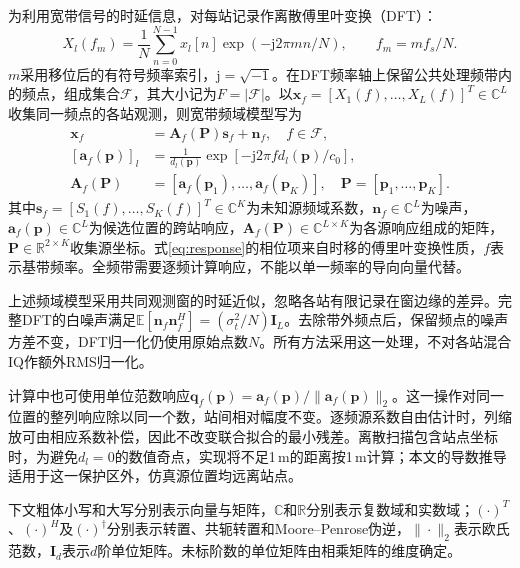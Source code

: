 \documentclass[a4paper,fleqn]{cas-sc}
\numberwithin{equation}{section}
\numberwithin{figure}{section}
\numberwithin{table}{section}
\newcommand{\R}{\mathbb R}
\newcommand{\C}{\mathbb C}
\newcommand{\E}{\mathbb E}
\begin{document}
为利用宽带信号的时延信息，对每站记录作离散傅里叶变换（DFT）：
\begin{equation}
 X_l(f_m)=\frac1N\sum_{n=0}^{N-1}x_l[n]
 \exp(-\mathrm j2\pi mn/N),\qquad f_m=mf_s/N .\label{eq:dft}
\end{equation}
$m$采用移位后的有符号频率索引，$\mathrm j=\sqrt{-1}$。在DFT频率轴上保留公共处理频带内的频点，组成集合$\mathcal F$，其大小记为$F=|\mathcal F|$。以$\bm x_f=[X_1(f),\ldots,X_L(f)]^T\in\C^L$收集同一频点的各站观测，则宽带频域模型写为\cite{ChenHudsonYao2002}
\begin{align}
 \bm x_f&=\bm A_f(\bm P)\bm s_f+\bm n_f,\quad f\in\mathcal F,\label{eq:frequency}\\
 [\bm a_f(\bm p)]_l&=\frac{1}{d_l(\bm p)}
       \exp[-\mathrm j2\pi f d_l(\bm p)/c_0],\label{eq:response}\\
 \bm A_f(\bm P)&=[\bm a_f(\bm p_1),\ldots,\bm a_f(\bm p_K)],\quad
 \bm P=[\bm p_1,\ldots,\bm p_K].\nonumber
\end{align}
其中$\bm s_f=[S_1(f),\ldots,S_K(f)]^T\in\C^K$为未知源频域系数，$\bm n_f\in\C^L$为噪声，$\bm a_f(\bm p)\in\C^L$为候选位置的跨站响应，$\bm A_f(\bm P)\in\C^{L\times K}$为各源响应组成的矩阵，$\bm P\in\R^{2\times K}$收集源坐标。式\eqref{eq:response}的相位项来自时移的傅里叶变换性质，$f$表示基带频率。全频带需要逐频计算响应，不能以单一频率的导向向量代替。

上述频域模型采用共同观测窗的时延近似，忽略各站有限记录在窗边缘的差异。完整DFT的白噪声满足$\E[\bm n_f\bm n_f^H]=(\sigma_t^2/N)\bm I_L$。去除带外频点后，保留频点的噪声方差不变，DFT归一化仍使用原始点数$N$。所有方法采用这一处理，不对各站混合IQ作额外RMS归一化。

计算中也可使用单位范数响应$\bm q_f(\bm p)=\bm a_f(\bm p)/\|\bm a_f(\bm p)\|_2$。这一操作对同一位置的整列响应除以同一个数，站间相对幅度不变。逐频源系数自由估计时，列缩放可由相应系数补偿，因此不改变联合拟合的最小残差。离散扫描包含站点坐标时，为避免$d_l=0$的数值奇点，实现将不足1\,m的距离按1\,m计算；本文的导数推导适用于这一保护区外，仿真源位置均远离站点。

下文粗体小写和大写分别表示向量与矩阵，$\C$和$\R$分别表示复数域和实数域；$(\cdot)^T$、$(\cdot)^H$及$(\cdot)^\dagger$分别表示转置、共轭转置和Moore--Penrose伪逆，$\|\cdot\|_2$表示欧氏范数，$\bm I_d$表示$d$阶单位矩阵。未标阶数的单位矩阵由相乘矩阵的维度确定。
\end{document}
